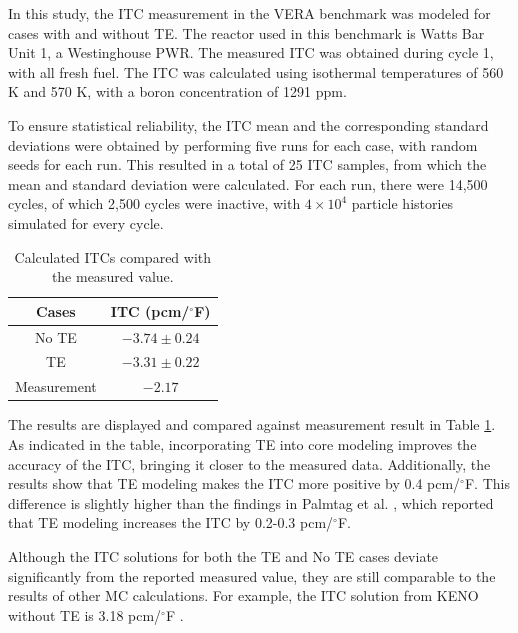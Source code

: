 In this study, the ITC measurement in the VERA benchmark was modeled for cases with and without TE. The reactor used in this benchmark is Watts Bar Unit 1, a Westinghouse PWR. The measured ITC was obtained during cycle 1, with all fresh fuel. The ITC was calculated using isothermal temperatures of 560 K and 570 K, with a boron concentration of 1291 ppm. 

To ensure statistical reliability, the ITC mean and the corresponding standard deviations were obtained by performing five runs for each case, with random seeds for each run. This resulted in a total of 25 ITC samples, from which the mean and standard deviation were calculated. For each run, there were 14,500 cycles, of which 2,500 cycles were inactive, with $4\times10^4$ particle histories simulated for every cycle.


\begin{table}
    \centering
    \caption{Calculated ITCs compared with the measured value.}
    \label{tab424} 
    \begin{tabular}{| c | c |}
    \hline 
    Cases & ITC (pcm/$^{\circ}$F) \\
     \hline
     No TE                & $-3.74 \pm 0.24 $    \\ \hline
     TE                   & $-3.31 \pm 0.22 $    \\ \hline
     Measurement          & $-2.17 $    \\ \hline
    \end{tabular}
\end{table}

The results are displayed and compared against measurement result in Table \ref{tab424}. As indicated in the table, incorporating TE into core modeling improves the accuracy of the ITC, bringing it closer to the measured data. Additionally, the results show that TE modeling makes the ITC more positive by 0.4 pcm/$^{\circ}$F. This difference is slightly higher than the findings in Palmtag et al. \cite{palmtag}, which reported that TE modeling increases the ITC by 0.2-0.3 pcm/$^{\circ}$F.

Although the ITC solutions for both the TE and No TE cases deviate significantly from the reported measured value, they are still comparable to the results of other MC calculations. For example, the ITC solution from KENO without TE is 3.18 pcm/$^{\circ}$F \cite{godfrey}.

